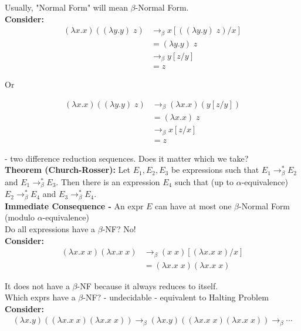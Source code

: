 \documentclass[11pt]{article}
\begin{document}
Usually, "Normal Form" will mean $\beta$-Normal Form. \\

{\bf Consider:} 
\begin{align*}
(\lambda x.x)((\lambda y.y)\;z) &\rightarrow_\beta x[((\lambda y.y)\;z)/x] \\
&= (\lambda y.y)\;z \\
&\rightarrow_\beta y[z/y] \\
&= z
\end{align*}

Or

\begin{align*}
(\lambda x.x)((\lambda y.y)\;z) &\rightarrow_\beta (\lambda x.x)(y[z/y]) \\
&= (\lambda x.x)\;z \\
&\rightarrow_\beta x[z/x] \\
&= z
\end{align*}

- two difference reduction sequences. Does it matter which we take? \\

\textbf{Theorem (Church-Rosser):} Let $E_1,E_2,E_3$ be expressions such that $E_1 \rightarrow_\beta^* E_2$ and $E_1 \rightarrow_\beta^* E_3$. Then there is an expression $E_4$ such that (up to $\alpha$-equivalence) $E_2 \rightarrow_\beta^* E_4$ and $E_3 \rightarrow_\beta^* E_4$. \\

{\bf Immediate Consequence -} An expr $E$ can have at most one $\beta$-Normal Form (modulo $\alpha$-equivalence) \\

Do all expressions have a $\beta$-NF? No!\\

{\bf Consider:}
\begin{align*}
(\lambda x.x\;x)(\lambda x.x\;x) &\rightarrow_\beta (x\;x)[(\lambda x.x\;x)/x] \\
&= (\lambda x.x\;x)(\lambda x.x\;x)
\end{align*}

It does not have a $\beta$-NF because it always reduces to itself. \\

Which exprs have a $\beta$-NF? - undecidable - equivalent to Halting Problem \\

{\bf Consider:}
\begin{align*}
(\lambda x.y)((\lambda x.x\;x)(\lambda x.x\;x)) \rightarrow_\beta (\lambda x.y)((\lambda x.x\;x)(\lambda x.x\;x)) \rightarrow_\beta \cdots
\end{align*}
\end{document}
